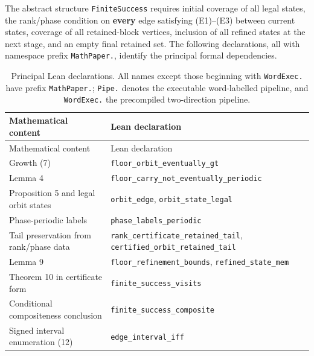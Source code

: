 \documentclass[11pt,reqno]{amsart}
\theoremstyle{definition}
\theoremstyle{remark}
\begin{document}
The abstract structure \texttt{FiniteSuccess} requires initial coverage of all
legal states, the rank/phase condition on \textbf{every} edge satisfying
(E1)--(E3) between current states, coverage of all retained-block
vertices, inclusion of all refined states at the next stage, and an empty
final retained set. The following declarations, all with namespace prefix
\texttt{MathPaper.}, identify the principal formal dependencies.


\begingroup
\small
\setlength{\tabcolsep}{4pt}
\renewcommand{\arraystretch}{1.15}
\setlength{\LTcapwidth}{\textwidth}
\begin{longtable}{@{}>{\raggedright\arraybackslash}p{} >{\raggedright\arraybackslash}p{}@{}}
\caption{Principal Lean declarations. All names except those beginning with
\texttt{WordExec.} have prefix \texttt{MathPaper.}; \texttt{Pipe.} denotes the
executable word-labelled pipeline, and \texttt{WordExec.} the precompiled
two-direction pipeline.}\label{tab:8}\\
\toprule
Mathematical content & Lean declaration \\
\midrule
\endfirsthead
\toprule
Mathematical content & Lean declaration \\
\midrule
\endhead
\bottomrule
\endlastfoot
Growth (7) & \nolinkurl{floor_orbit_eventually_gt} \\
Lemma 4 & \nolinkurl{floor_carry_not_eventually_periodic} \\
Proposition 5 and legal orbit states & \nolinkurl{orbit_edge},\allowbreak{} \nolinkurl{orbit_state_legal} \\
Phase-periodic labels & \nolinkurl{phase_labels_periodic} \\
Tail preservation from rank/phase data & \nolinkurl{rank_certificate_retained_tail},\allowbreak{} \nolinkurl{certified_orbit_retained_tail} \\
Lemma 9 & \nolinkurl{floor_refinement_bounds},\allowbreak{} \nolinkurl{refined_state_mem} \\
Theorem 10 in certificate form & \nolinkurl{finite_success_visits} \\
Conditional compositeness conclusion & \nolinkurl{finite_success_composite} \\
Signed interval enumeration (12) & \nolinkurl{edge_interval_iff} \\

\end{longtable}
\end{document}
